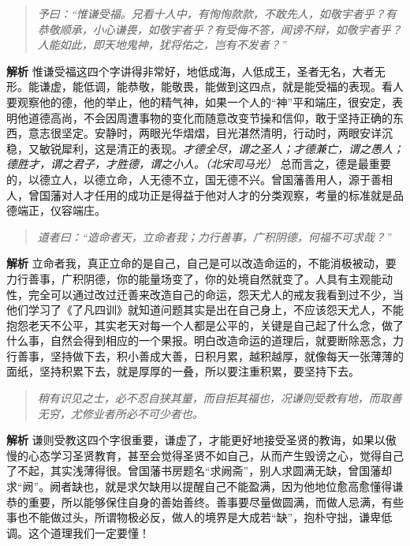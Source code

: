\begin{quote}\it
    予曰：“惟谦受福。兄看十人中，有恂恂款款，不敢先人，如敬宇者乎？有恭敬顺承，小心谦畏，如敬宇者乎？有受侮不答，闻谤不辩，如敬宇者乎？人能如此，即天地鬼神，犹将佑之，岂有不发者？”
\end{quote}

\textbf{解析} 惟谦受福这四个字讲得非常好，地低成海，人低成王，圣者无名，大者无形。能谦虚，能低调，能恭敬，能敬畏，能做到这四点，就是能受福的表现。看人要观察他的德，他的举止，他的精气神，如果一个人的“神”平和端庄，很安定，表明他道德高尚，不会因周遭事物的变化而随意改变节操和信仰，敢于坚持正确的东西，意志很坚定。安静时，两眼光华熠熠，目光湛然清明，行动时，两眼安详沉稳，又敏锐犀利，这是清正的表现。\textit{才德全尽，谓之圣人；才德兼亡，谓之愚人；德胜才，谓之君子，才胜德，谓之小人。（北宋司马光）} 总而言之，德是最重要的，以德立人，以德立命，人无德不立，国无德不兴。曾国藩善用人，源于善相人，曾国藩对人才任用的成功正是得益于他对人才的分类观察，考量的标准就是品德端正，仪容端庄。

\begin{quote}\it
    道者曰：“造命者天，立命者我；力行善事，广积阴德，何福不可求哉？”
\end{quote}

\textbf{解析} 立命者我，真正立命的是自己，自己是可以改造命运的，不能消极被动，要力行善事，广积阴德，你的能量场变了，你的处境自然就变了。人具有主观能动性，完全可以通过改过迁善来改造自己的命运，怨天尤人的戒友我看到过不少，当他们学习了《了凡四训》就知道问题其实是出在自己身上，不应该怨天尤人，不能抱怨老天不公平，其实老天对每一个人都是公平的，关键是自己起了什么念，做了什么事，自然会得到相应的一个果报。明白改造命运的道理后，就要断除恶念，力行善事，坚持做下去，积小善成大善，日积月累，越积越厚，就像每天一张薄薄的面纸，坚持积累下去，就是厚厚的一叠，所以要注重积累，要坚持下去。

\begin{quote}\it
    稍有识见之士，必不忍自狭其量，而自拒其福也，况谦则受教有地，而取善无穷，尤修业者所必不可少者也。
\end{quote}

\textbf{解析} 谦则受教这四个字很重要，谦虚了，才能更好地接受圣贤的教诲，如果以傲慢的心态学习圣贤教育，甚至会觉得圣贤不如自己，从而产生毁谤之心，觉得自己了不起，其实浅薄得很。曾国藩书房题名“求阙斋”，别人求圆满无缺，曾国藩却求“阙”。阙者缺也，就是求欠缺用以提醒自己不能盈满，因为他地位愈高愈懂得谦恭的重要，所以能够保住自身的善始善终。善事要尽量做圆满，而做人忌满，有些事也不能做过头，所谓物极必反，做人的境界是大成若“缺”，抱朴守拙，谦卑低调。这个道理我们一定要懂！

